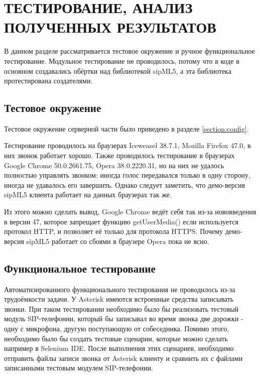 \chapter{ТЕСТИРОВАНИЕ, АНАЛИЗ ПОЛУЧЕННЫХ РЕЗУЛЬТАТОВ}

В данном разделе рассматривается тестовое окружение и ручное функциональное тестирование. Модульное тестирование не проводилось, потому что в коде в основном создавались обёртки над библиотекой sipML5, а эта библиотека протестирована создателями.

\section{Тестовое окружение}

Тестовое окружение серверной части было приведено в разделе \ref{section:config}.

Тестирование проводилось на браузерах Iceweasel 38.7.1, Mozilla Firefox 47.0, в них звонок работает хорошо. Также проводилось тестирование в браузерах Google Chrome 50.0.2661.75, Opera 38.0.2220.31, но на них не удалось полностью управлять звонком: иногда голос передавался только в одну сторону, иногда не удавалось его завершить. Однако следует заметить, что демо-версия sipML5 клиента\cite{sipML5_demo} работает на данных браузерах так же.

Из этого можно сделать вывод, Google Chrome ведёт себя так из-за нововведения в версии 47, которое запрещает функцию getUserMedia() если используется протокол HTTP, и позволяет её только для протокола HTTPS.\cite{chrome_https} Почему демо-версия sipML5 работает со сбоями в браузере Opera пока не ясно.

\section{Функциональное тестирование}

Автоматизированного функционального тестирования не проводилось из-за трудоёмкости задачи. У Asterisk имеются встроенные средства записывать звонки. При таком тестировании необходимо было бы реализовать тестовый модуль SIP-телефонии, который бы записывал во время звонка две дорожки - одну с микрофона, другую поступающую от собеседника. Помимо этого, необходимо было бы создать тестовые сценарии, которые можно сделать например в Selenium IDE. После выполнения этих сценариев, необходимо отправить файлы записи звонка от Asterisk клиенту и сравнить их с файлами записанными тестовым модулем SIP-телефонии.

